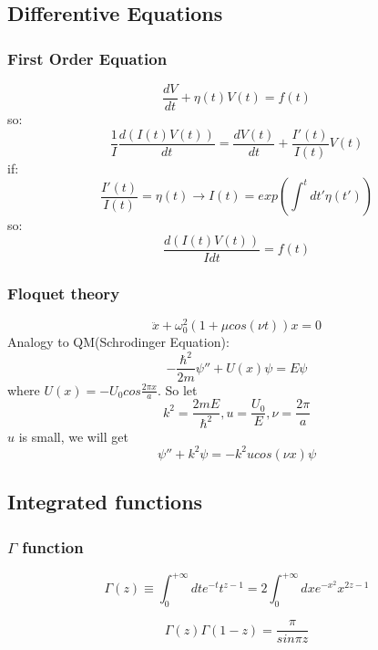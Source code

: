 \subsection{Differentive Equations}

\subsubsection{First Order Equation}
\[ 
\frac{dV}{dt} + \eta(t)V(t) = f(t)  
\]
so:
\[
    \frac{1}{I}\frac{d(I(t)V(t))}{dt} = \frac{dV(t)}{dt} + \frac{I'(t)}{I(t)}V(t)
    \]
if: 
\[ 
    \frac{I'(t)}{I(t)} = \eta(t)	\rightarrow I(t) = exp(\int^{t}dt'\eta(t'))
    \]
so:
\[ \frac{d(I(t)V(t))}{I dt} = f(t)\]

\subsubsection{Floquet theory}
\begin{equation}
    \ddot{x} + \omega_{0}^{2}(1+\mu cos(\nu t))x = 0
\end{equation}
Analogy to QM(Schrodinger Equation):	
\[
    -\frac{\hbar^{2}}{2m}{\psi''} + U(x)\psi = E\psi
    \]
where $U(x) = -U_{0}cos\frac{2\pi x}{a}$.
So let 
\[
    k^{2} = \frac{2mE}{\hbar^{2}}, u=\frac{U_0}{E}, \nu=\frac{2\pi}{a}
    \]
$u$ is small, we will get   
\[ 
    \psi''+k^{2}\psi = -k^{2}ucos(\nu x)\psi
    \]

\subsection{Integrated functions}
\subsubsection{$\Gamma$ function}
\[\Gamma(z) \equiv \int_{0}^{+\infty}dt e^{-t} t^{z-1} =
2\int_{0}^{+\infty}dx e^{-x^2}x^{2z-1}\]

\[\Gamma(z)\Gamma(1-z) = \frac{\pi}{sin\pi z}\]

